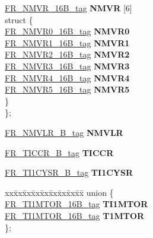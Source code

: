 \begin{DoxyCompactItemize}
\begin{tabbing}
\>\mbox{\hyperlink{unionFR__NMVR__16B__tag}{FR\_NMVR\_16B\_tag}} {\bfseries NMVR} \mbox{[}6\mbox{]}\\
\mbox{\label{unionFR__struct__tag_1_1_0D2500_a7508dbd989f407e816de258afbb3400d}} 
\>struct \{\\
\>\>\mbox{\hyperlink{unionFR__NMVR0__16B__tag}{FR\_NMVR0\_16B\_tag}} {\bfseries NMVR0}\\
\>\>\mbox{\hyperlink{unionFR__NMVR1__16B__tag}{FR\_NMVR1\_16B\_tag}} {\bfseries NMVR1}\\
\>\>\mbox{\hyperlink{unionFR__NMVR2__16B__tag}{FR\_NMVR2\_16B\_tag}} {\bfseries NMVR2}\\
\>\>\mbox{\hyperlink{unionFR__NMVR3__16B__tag}{FR\_NMVR3\_16B\_tag}} {\bfseries NMVR3}\\
\>\>\mbox{\hyperlink{unionFR__NMVR4__16B__tag}{FR\_NMVR4\_16B\_tag}} {\bfseries NMVR4}\\
\>\>\mbox{\hyperlink{unionFR__NMVR5__16B__tag}{FR\_NMVR5\_16B\_tag}} {\bfseries NMVR5}\\
\>\} \\
\}; \\

\end{tabbing}\item 
\mbox{\label{structFR__struct__tag_a974f37763bc8b336f9a30c9309059b62}} 
\mbox{\hyperlink{unionFR__NMVLR__16B__tag}{F\+R\+\_\+\+N\+M\+V\+L\+R\+\_\+B\+\_\+tag}} {\bfseries N\+M\+V\+LR}
\item 
\mbox{\label{structFR__struct__tag_a87258f0158454446ace032d585231ed3}} 
\mbox{\hyperlink{unionFR__TICCR__16B__tag}{F\+R\+\_\+\+T\+I\+C\+C\+R\+\_\+B\+\_\+tag}} {\bfseries T\+I\+C\+CR}
\item 
\mbox{\label{structFR__struct__tag_a10e5e7d064715919217c7cc3a1e4a3ec}} 
\mbox{\hyperlink{unionFR__TI1CYSR__16B__tag}{F\+R\+\_\+\+T\+I1\+C\+Y\+S\+R\+\_\+B\+\_\+tag}} {\bfseries T\+I1\+C\+Y\+SR}
\item 
\mbox{\label{structFR__struct__tag_a502ac0dcd75f6c65a55756d00f218d2c}} 
\begin{tabbing}
xx\=xx\=xx\=xx\=xx\=xx\=xx\=xx\=xx\=\kill
union \{\\
\>\mbox{\hyperlink{unionFR__TI1MTOR__16B__tag}{FR\_TI1MTOR\_16B\_tag}} {\bfseries TI1MTOR}\\
\>\mbox{\hyperlink{unionFR__TI1MTOR__16B__tag}{FR\_TI1MTOR\_16B\_tag}} {\bfseries T1MTOR}\\
\}; \\


\end{tabbing}
\end{DoxyCompactItemize}
